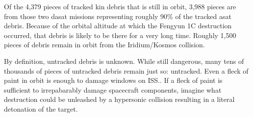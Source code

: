 Of the 4,379 pieces of tracked \ac{kin} debris that is still in orbit,
3,988 pieces are from those two \ac{dasat} missions representing
roughly 90\% of the tracked \ac{asat} debris.\cite[Table 5-1,
  p05-01]{brian} Because of the orbital altitude at which the Fengyun
1C destruction occurred, that debris is likely to be there for a very
long time.\cite{osa-debris} Roughly 1,500 pieces of debris remain
in orbit from the Iridium/Kosmos collision.

By definition, untracked debris is unknown.  While still dangerous,
many tens of thousands of pieces of untracked debris remain just so:
untracked.\cite[p05-01]{brian} Even a fleck of paint in orbit is
enough to damage windows on ISS.\cite[dig this one up]{xxx}.  If a
fleck of paint is sufficient to irrepabarably damage spacecraft
components, imagine what destruction could be unleashed by a
hypersonic collision resulting in a literal detonation of the
target.\cite[one of the hypersonic papers]{xxx}

